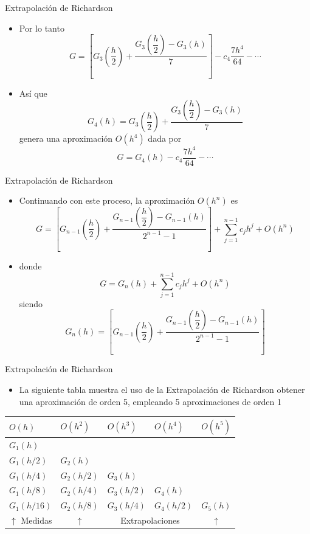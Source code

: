 \documentclass[12pt]{beamer}
\begin{document}
\begin{frame}{Extrapolaci\'on de Richardson}
  \begin{itemize}
    \item Por lo tanto
    $$
    G=\left[G_3\left(\dfrac{h}{2}\right)+\dfrac{G_3\left(\dfrac{h}{2}\right)-G_3(h)}{7}\right] - c_4\dfrac{7h^4}{64} - 
    \cdots
    $$
    \item<2-> As\'i que 
      $$
      G_4(h) = G_3\left(\dfrac{h}{2}\right)+\dfrac{G_3\left(\dfrac{h}{2}\right)-G_3(h)}{7}
      $$
      genera una aproximaci\'on $O(h^4)$ dada por
      $$
      G = G_4(h)- c_4\dfrac{7h^4}{64} - \cdots
      $$
  \end{itemize}
\end{frame}
\begin{frame}{Extrapolaci\'on de Richardson}
  \begin{itemize}
    \item Continuando con este proceso, la aproximaci\'on $O(h^n)$ es
    $$
    G = \left[G_{n-1}\left(\dfrac{h}{2}\right)+ \dfrac{G_{n-1}\left(\dfrac{h}{2}\right)-G_{n-1}(h)}{2^{n-1}-1}\right] + 
    \sum_{j=1}^{n-1}c_jh^j + O(h^n)
    $$
    \item<2-> donde
    $$
    G = G_n(h) + \sum_{j=1}^{n-1}c_jh^j + O(h^n)
    $$
    siendo
    $$
    G_n(h) = \left[G_{n-1}\left(\dfrac{h}{2}\right)+ \dfrac{G_{n-1}\left(\dfrac{h}{2}\right)-G_{n-1}(h)}{2^{n-1}-1}\right]
    $$    
  \end{itemize}
\end{frame}
\begin{frame}{Extrapolaci\'on de Richardson}
  \begin{itemize}
    \item La siguiente tabla muestra el uso de la Extrapolaci\'on de Richardson obtener una aproximaci\'on de orden 5, empleando 5 aproximaciones de orden 1
  \end{itemize}
    \begin{table}            
      \begin{center}
        \begin{tabular}{||l|llll||}\hline
          $O(h)$ & $O(h^2)$ & $O(h^3)$ & $O(h^4)$ & $O(h^5)$ \\\hline
          $G_1(h)$ &&&&\\
          $G_1(h/2)$ & $G_2(h)$ &&&\\
          $G_1(h/4)$ & $G_2(h/2)$ & $G_3(h)$ &&\\
          $G_1(h/8)$ & $G_2(h/4)$ & $G_3(h/2)$ & $G_4(h)$ &\\
          $G_1(h/16)$ & $G_2(h/8)$ & $G_3(h/4)$ & $G_4(h/2)$ & $G_5(h)$ \\\hline
          $\uparrow$ {\color{red}Medidas} & \multicolumn{1}{c}{$\uparrow$} & \multicolumn{2}{c}{\color{red}Extrapolaciones} & \multicolumn{1}{c||}{$\uparrow$} \\\hline
        \end{tabular}
      \end{center}
    \end{table}
\end{frame}
\end{document}
